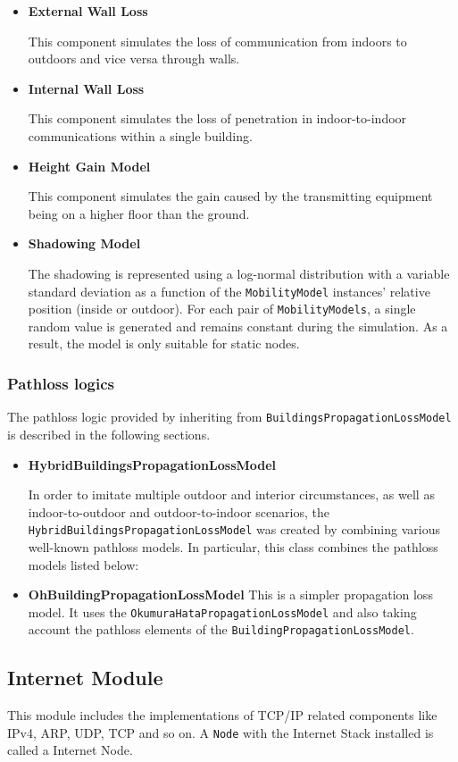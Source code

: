\begin{itemize}
  \item \textbf{External Wall Loss}

  This component simulates the loss of communication from indoors to outdoors and vice versa through walls.
  \item \textbf{Internal Wall Loss}

  This component simulates the loss of penetration in indoor-to-indoor communications within a single building.
  \item \textbf{Height Gain Model}

  This component simulates the gain caused by the transmitting equipment being on a higher floor than the ground.
  \item \textbf{Shadowing Model}

  The shadowing is represented using a log-normal distribution with a variable standard deviation
  as a function of the \texttt{MobilityModel} instances' relative position (inside or outdoor). For each 
  pair of \texttt{MobilityModels}, a single random value is generated and remains constant during the 
  simulation. As a result, the model is only suitable for static nodes.
\end{itemize}

\subsubsection{Pathloss logics}
The pathloss logic provided by inheriting from \texttt{BuildingsPropagationLossModel}
is described in the following sections.
\begin{itemize}
  \item \textbf{HybridBuildingsPropagationLossModel}

  In order to imitate multiple outdoor and interior circumstances, as well as indoor-to-outdoor 
  and outdoor-to-indoor scenarios, the \texttt{HybridBuildingsPropagationLossModel} was created by 
  combining various well-known pathloss models. In particular, this class combines the pathloss 
  models listed below:

  \item \textbf{OhBuildingPropagationLossModel}
  This is a simpler propagation loss model. It uses the \texttt{OkumuraHataPropagationLossModel} and 
  also taking account the pathloss elements of the \texttt{BuildingPropagationLossModel}.
\end{itemize}

\subsection{Internet Module}
This module includes the implementations of TCP/IP related components like IPv4, ARP, UDP, TCP and so on.
A \texttt{Node} with the Internet Stack installed is called a Internet Node.

